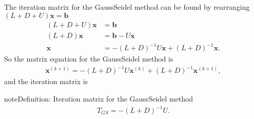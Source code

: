 \documentclass[letterpaper,10pt,english]{jupyterBook}
\begin{document}
\sphinxAtStartPar
The iteration matrix for the Gauss\sphinxhyphen{}Seidel method can be found by rearranging \((L+D+U)\mathbf{x}=\mathbf{b}\)
\begin{align*}
    (L+D+U)\mathbf{x}&=\mathbf{b}\\
    (L+D)\mathbf{x}&=\mathbf{b}-U\mathbf{x}\\
    \mathbf{x}&=-(L+D)^{-1} U\mathbf{x}+(L+D)^{-1} \mathbf{x}.
\end{align*}
\sphinxAtStartPar
So the matrix equation for the Gauss\sphinxhyphen{}Seidel method is
\begin{align*}
    \mathbf{x}^{(k+1)} =-(L+D)^{-1} U\mathbf{x}^{(k)} +(L+D)^{-1} \mathbf{x}^{(k+1)},
\end{align*}
\sphinxAtStartPar
and the iteration matrix is

\begin{sphinxadmonition}{note}{Definition: Iteration matrix for the Gauss\sphinxhyphen{}Seidel method}
\begin{equation}\label{equation:7_Indirect_methods/7.2_Gauss_Seidel_method:gauss-seidel-method-iteration-matrix-equation}
\begin{split}T_{GS} =-(L+D)^{-1} U.\end{split}
\end{equation}\end{sphinxadmonition}
\end{document}
